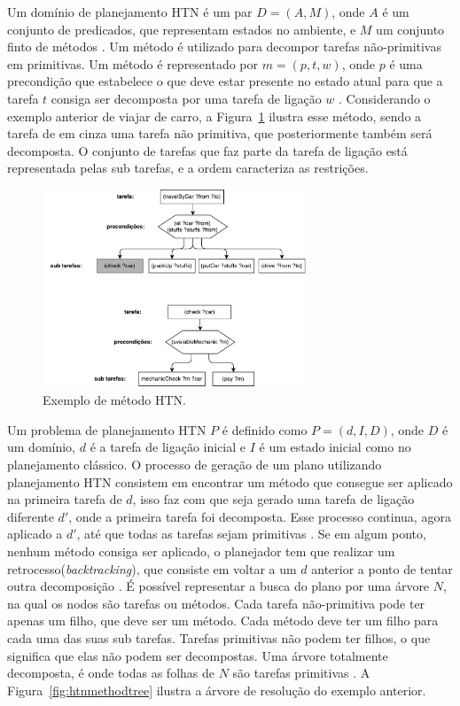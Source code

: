 Um domínio de planejamento HTN é um par $D = (A, M)$, onde $A$ é um conjunto de predicados, que representam estados no ambiente, e $M$ um conjunto finto de métodos \cite{meneguzzi2015planning}. 
Um método é utilizado para decompor tarefas não-primitivas em primitivas. 
Um método é representado por $m = (p, t, w)$, onde $p$ é uma precondição que estabelece o que deve estar presente no estado atual para que a tarefa $t$ consiga ser decomposta por uma tarefa de ligação $w$ \cite{ghallab2004automated}. 
Considerando o exemplo anterior de viajar de carro, a Figura~\ref{fig:htnmethod} ilustra esse método, sendo a tarefa de em cinza uma tarefa não primitiva, que posteriormente também será decomposta. 
O conjunto de tarefas que faz parte da tarefa de ligação está representada pelas sub tarefas, e a ordem caracteriza as restrições. 

\begin{figure}[ht]
	\centering
	\includegraphics[width=0.7\textwidth]{fig/htnmethod.pdf}
	\caption{Exemplo de método HTN.}
	\label{fig:htnmethod}
\end{figure} 

Um problema de planejamento HTN $P$ é definido como $P = (d, I, D)$, onde $D$ é um domínio, $d$ é a tarefa de ligação inicial e $I$ é um estado inicial como no planejamento clássico. 
O processo de geração de um plano utilizando planejamento HTN consistem em encontrar um método que consegue ser aplicado na primeira tarefa de $d$, isso faz com que seja gerado uma tarefa de ligação diferente $d'$, onde a primeira tarefa foi decomposta. 
Esse processo continua, agora aplicado a $d'$, até que todas as tarefas sejam primitivas \cite{meneguzzi2015planning}. 
Se em algum ponto, nenhum método consiga ser aplicado, o planejador tem que realizar um retrocesso(\textit{backtracking}), que consiste em voltar a um $d$ anterior a ponto de tentar outra decomposição \cite{intelligence2003modern}. 
É possível representar a busca do plano por uma árvore $N$, na qual os nodos são tarefas ou métodos. 
Cada tarefa não-primitiva pode ter apenas um filho, que deve ser um método. 
Cada método deve ter um filho para cada uma das suas sub tarefas. 
Tarefas primitivas não podem ter filhos, o que significa que elas não podem ser decompostas. 
Uma árvore totalmente decomposta, é onde todas as folhas de $N$ são tarefas primitivas \cite{ontanon2015adversarial}. 
A Figura~\ref{fig:htnmethodtree} ilustra a árvore de resolução do exemplo anterior.

